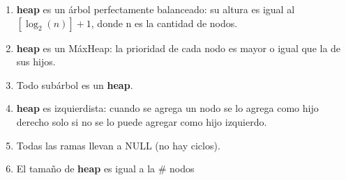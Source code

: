 \begin{enumerate}[wide]
\item \textbf{heap} es un árbol perfectamente balanceado: su altura es igual al $[\log_2 (n)] + 1$, donde n es la cantidad de nodos.
\item \textbf{heap} es un MáxHeap: la prioridad de cada nodo es mayor o igual que la de sus hijos.
\item Todo subárbol es un \textbf{heap}.
\item \textbf{heap} es izquierdista: cuando se agrega un nodo se lo agrega como hijo derecho solo si no se lo puede agregar como hijo izquierdo.
\item Todas las ramas llevan a NULL (no hay ciclos).
\item El tamaño de \textbf{heap} es igual a la \# nodos
\end{enumerate}







